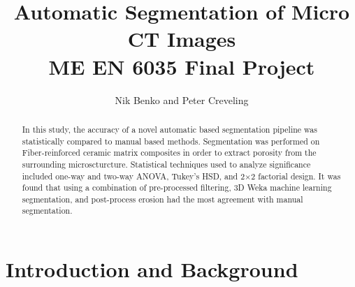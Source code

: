 \documentclass[12pt]{article}
\begin{document}
\title{ Automatic Segmentation of Micro CT Images  \\ \normalsize{ME EN 6035 Final Project}}
\author{Nik Benko and Peter Creveling}
\maketitle


\begin{abstract} 
In this study, the accuracy of a novel automatic based segmentation pipeline was statistically compared to manual based methods. Segmentation was performed on Fiber-reinforced ceramic matrix composites in order to extract porosity from the surrounding microscturcture. Statistical techniques used to analyze significance included one-way and two-way ANOVA, Tukey's HSD, and 2$\times$2 factorial design. It was found that using a combination of pre-processed filtering, 3D Weka machine learning segmentation, and post-process erosion had the most agreement with manual segmentation.
\end{abstract}

\section{Introduction and Background}
\end{document}

